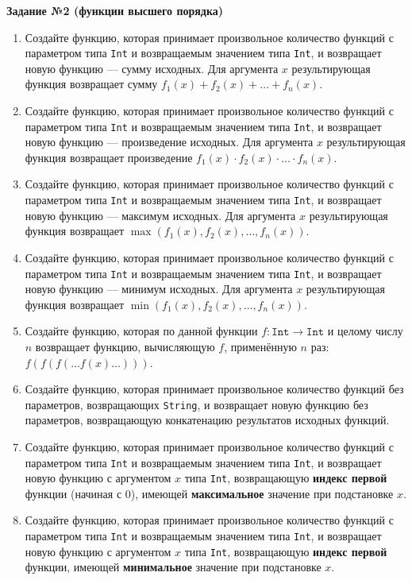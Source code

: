 \textbf{Задание №2 (функции высшего порядка)}

\begin{enumerate}
    \item Создайте функцию, которая принимает произвольное количество функций с параметром типа \texttt{Int} и возвращаемым значением типа \texttt{Int}, и возвращает новую функцию — сумму исходных. Для аргумента \( x \) результирующая функция возвращает сумму \( f_1(x) + f_2(x) + \dots + f_n(x) \).
    \item Создайте функцию, которая принимает произвольное количество функций с параметром типа \texttt{Int} и возвращаемым значением типа \texttt{Int}, и возвращает новую функцию — произведение исходных. Для аргумента \( x \) результирующая функция возвращает произведение \( f_1(x) \cdot f_2(x) \cdot \dots \cdot f_n(x) \).
    \item Создайте функцию, которая принимает произвольное количество функций с параметром типа \texttt{Int} и возвращаемым значением типа \texttt{Int}, и возвращает новую функцию — максимум исходных. Для аргумента \( x \) результирующая функция возвращает \( \max(f_1(x), f_2(x), \dots, f_n(x)) \).
    \item Создайте функцию, которая принимает произвольное количество функций с параметром типа \texttt{Int} и возвращаемым значением типа \texttt{Int}, и возвращает новую функцию — минимум исходных. Для аргумента \( x \) результирующая функция возвращает \( \min(f_1(x), f_2(x), \dots, f_n(x)) \).
    \item Создайте функцию, которая по данной функции \( f: \texttt{Int} \to \texttt{Int} \) и целому числу \( n \) возвращает функцию, вычисляющую \( f \), применённую \( n \) раз: \( f(f(f(\dots f(x)\dots))) \).
    \item Создайте функцию, которая принимает произвольное количество функций без параметров, возвращающих \texttt{String}, и возвращает новую функцию без параметров, возвращающую конкатенацию результатов исходных функций.
    \item Создайте функцию, которая принимает произвольное количество функций с параметром типа \texttt{Int} и возвращаемым значением типа \texttt{Int}, и возвращает новую функцию с аргументом \( x \) типа \texttt{Int}, возвращающую \textbf{индекс первой} функции (начиная с 0), имеющей \textbf{максимальное} значение при подстановке \( x \).
    \item Создайте функцию, которая принимает произвольное количество функций с параметром типа \texttt{Int} и возвращаемым значением типа \texttt{Int}, и возвращает новую функцию с аргументом \( x \) типа \texttt{Int}, возвращающую \textbf{индекс первой} функции, имеющей \textbf{минимальное} значение при подстановке \( x \).

\end{enumerate}
